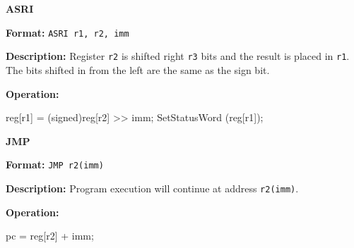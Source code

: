 \noindent\textsf{\textbf{\Large ASRI}}\par
{}\par\begin{indented}{\bf Format:}
{\tt ASRI r1, r2, imm}\par\vspace{3ex}
\end{indented}\vspace{4ex}
\begin{indented}{\bf Description:}
Register {\tt r2} is shifted right {\tt r3} bits and the result is placed
in {\tt r1}.  The bits shifted in from the left are the same as the sign
bit.
\end{indented}
\begin{indented}{\bf Operation:}\vspace{.8ex}
\begin{verbatimtab}
reg[r1] = (signed)reg[r2] >> imm;
SetStatusWord (reg[r1]);
\end{verbatimtab}
\end{indented}
\vspace{2em}

\newpage
{}
\noindent\textsf{\textbf{\Large JMP}}\par
{}\par\begin{indented}{\bf Format:}
{\tt JMP r2(imm)}\par\vspace{3ex}
\end{indented}\vspace{4ex}
\begin{indented}{\bf Description:}
Program execution will continue at address {\tt r2(imm)}.
\end{indented}
\begin{indented}{\bf Operation:}\vspace{.8ex}
\begin{verbatimtab}
pc = reg[r2] + imm;
\end{verbatimtab}
\end{indented}
\vspace{2em}

